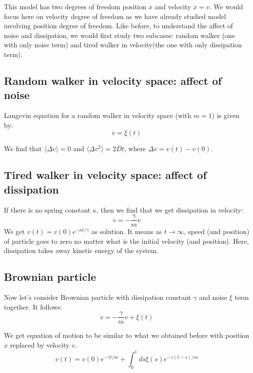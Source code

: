 \documentclass[11pt,a4paper]{article}
\begin{document}
This model has two degrees of freedom position $x$ and velocity $\dot{x}=v$. We would focus here on velocity degree of freedom as we have already studied model involving position degree of freedom. Like before, to understand the affect of noise and dissipation, we would first study two subcases: random walker (one with only noise term) and tired walker in velocity(the one with only dissipation term). 





\subsection*{Random walker in velocity space: affect of noise}
Langevin equation for a random walker in velocity space (with $m=1$) is given by:
\begin{equation}
\dot{v}=  \xi(t)
\end{equation}

We find that  $\langle \Delta v\rangle=0$ and $\langle \Delta v ^2\rangle=2 Dt$, where $\Delta v= v(t)-v(0)$.


\subsection*{Tired walker in velocity space: affect of dissipation}

If there is no spring constant $\kappa$, then  we find that we get dissipation in velocity:
\begin{equation}
\dot{v}=  - \frac{\gamma } {m}v 
\end{equation}
We get $v(t)=v(0) e^{-\kappa t/\gamma}$ as solution. It means as $t\rightarrow \infty$, speed (and position) of particle goes to zero no matter what is the initial velocity (and position). Here, dissipation takes away kinetic energy of the system. 

\subsection*{Brownian particle}
Now let's consider Brownian particle with dissipation constant $\gamma$ and noise $\xi$ term together. It follows:
\begin{equation}
\dot{v}= -\dfrac{\gamma}{m} v + \xi(t)
\label{eom_vel}
\end{equation}




We get equation of motion to be similar to what we obtained before with position $x$ replaced by velocity $v$.
\begin{equation}
v(t)= v(0) e^{-\gamma t /m} + \int_0^t ds  \xi(s) e^{-\gamma (t-s)/m} 
\label{sol_vel}
\end{equation}
\end{document}
